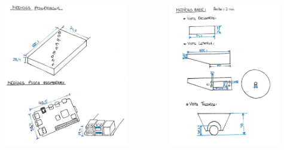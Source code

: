 \documentclass{beamer}
\begin{document}
\begin{frame}
	\vspace{0.5cm}  %
	\begin{columns}
		\begin{column}{0.25\textwidth}
			\centering
			\includegraphics[width=0.8\textwidth]{figs/planos1.jpeg} \\[5pt]
		\end{column}
		\begin{column}{0.25\textwidth}
			\centering
			\includegraphics[width=0.8\textwidth]{figs/planos2.jpeg} \\[5pt]

\end{column}
\end{columns}
\end{frame}
\end{document}
